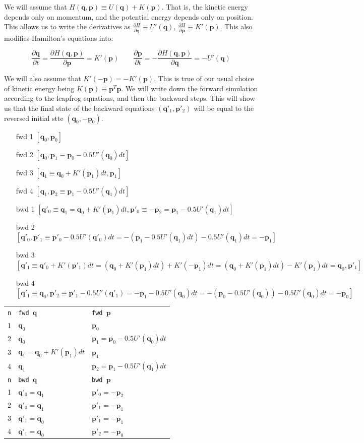 \documentclass[titlepage]{article}
\newcommand{\p}{\mathbf{p}}
\newcommand{\q}{\mathbf{q}}
\begin{document}
We will assume that $H(\q, \p) \equiv U(\q) + K(\p)$. That is, the kinetic
energy depends only on momentum, and the potential energy depends only
on position. This allows us to write the derivatives as
$\frac{\partial H}{\partial \q} \equiv U'(\q)$,
$\frac{\partial H}{\partial \p} \equiv K'(\p)$. This also modifies Hamilton's
equations into:

$$
\frac{\partial \q}{\partial t} = \frac{\partial H(\q, \p)}{\partial \p} = K'(\p) \qquad
\frac{\partial \p}{\partial t} = -\frac{\partial H(\q, \p)}{\partial \q} = -U'(\q)
$$

We will also assume that $K'(-\p) = -K'(\p)$. This is true of our usual
choice of kinetic energy being $K(\p) \equiv \p^T \p$. We will
write down the forward simulation according to the leapfrog equations,
and then the backward steps. This will show us that the final
state of the backward equations $(\q'_1, \p'_2)$ will be equal
to the reversed initial stte $(\q_0, -\p_0)$.

{\footnotesize
\begin{itemize}
    \item[fwd 1] $\left[ \q_0, \p_0 \right]$
    \item[fwd 2] $\left[ \q_0, \p_1 \equiv \p_0 - 0.5U'(\q_0)dt \right]$
    \item[fwd 3] $\left[ \q_1 \equiv \q_0 + K'(\p_1)dt, \p_1 \right]$
    \item[fwd 4] $\left[ \q_1, \p_2 \equiv  \p_1 - 0.5U'(\q_1)dt \right]$
    \item[bwd 1] $\left[ \q'_0 \equiv \q_1 = \q_0 + K'(\p_1)dt, \p'_0 \equiv -\p_2 = \p_1 - 0.5U'(\q_1)dt \right]$
    \item[bwd 2] $\left[ \q'_0, \p'_1 \equiv \p'_0 - 0.5U'(\q'_0)dt = -(\p_1 - 0.5U'(\q_1)dt) - 0.5U'(\q_1)dt = -\p_1 \right]$
    \item[bwd 3] $\left[ \q'_1 \equiv \q'_0 + K'(\p'_1)dt = (\q_0 + K'(\p_1)dt) + K'(-\p_1)dt = (\q_0 + K'(\p_1)dt) -K'(\p_1)dt  = \q_0, \p'_1 \right]$
    \item[bwd 4] $\left[ \q'_1 \equiv \q_0, \p'_2 \equiv \p'_1 - 0.5U'(\q'_1) = -\p_1 - 0.5U'(\q_0)dt = -(\p_0 - 0.5U'(\q_0)) -  0.5U'(\q_0)dt = -\p_0  \right]$
\end{itemize}

\begin{tabular}{lll}
    \texttt{n} & \texttt{fwd $\q$} &  \texttt{fwd $\p$}  \\
    1 & $\q_0$ & $\p_0$  \\
    2 & $\q_0$ & $\p_1 =  \p_0 - 0.5U'(\q_0)dt$ \\
    3 & $\q_1 = \q_0 + K'(\p_1)dt$ & $\p_1$ \\
    4 & $\q_1$ & $\p_2 =  \p_1 - 0.5U'(\q_1)dt$ \\
    \hline
    \texttt{n} & \texttt{bwd $\q$} &  \texttt{bwd $\p$}  \\
    1 & $\q'_0 = \q_1 $ & $\p'_0 = -\p_2 $ \\
    2 & $\q'_0 = \q_1 $ & $\p'_1 = -\p_1$ \\
    3 & $\q'_1 = \q_0$ & $\p'_1 = -\p_1$\\
    4 & $\q'_1 = \q_0$ & $\p'_2 = -\p_0$ \\
\end{tabular}
}
\end{document}
